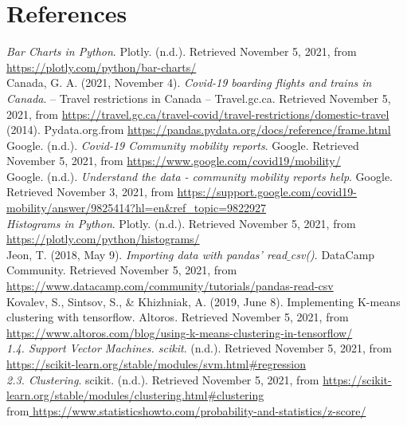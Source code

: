 \documentclass[fontsize=11pt]{article}
\begin{document}
    \newpage
    \section*{References}

    \begin{hangparas}{.25in}{1}

        \emph{Bar Charts in Python}. Plotly. (n.d.). Retrieved November 5, 2021, from \url{https://plotly.com/python/bar-charts/} \\

        Canada, G. A. (2021, November 4). \emph{Covid-19 boarding flights and trains in Canada}. – Travel restrictions in Canada – Travel.gc.ca. Retrieved November
        5, 2021, from \url{https://travel.gc.ca/travel-covid/travel-restrictions/domestic-travel} \\

        (2014). Pydata.org.from \url{https://pandas.pydata.org/docs/reference/frame.html}\\

        Google. (n.d.). \emph{Covid-19 Community mobility reports}. Google. Retrieved November 5, 2021, from \url{https://www.google.com/covid19/mobility/} \\

        Google. (n.d.). \emph{Understand the data - community mobility reports help}. Google. Retrieved November 3, 2021, from \url{https://support.google.com/covid19-mobility/answer/9825414?hl=en\&ref_topic=9822927} \\

        \emph{Histograms in Python}. Plotly. (n.d.). Retrieved November 5, 2021, from \url{https://plotly.com/python/histograms/} \\

        Jeon, T. (2018, May 9). \emph{Importing data with pandas' read$\_$csv()}. DataCamp Community. Retrieved November 5, 2021, from \url{https://www.datacamp.com/community/tutorials/pandas-read-csv} \\

        Kovalev, S., Sintsov, S., \& Khizhniak, A. (2019, June 8). Implementing K-means clustering with tensorflow. Altoros. Retrieved November 5, 2021, from \url{https://www.altoros.com/blog/using-k-means-clustering-in-tensorflow/}\\

        \emph{1.4. Support Vector Machines. scikit}. (n.d.). Retrieved November 5, 2021, from \url{https://scikit-learn.org/stable/modules/svm.html\#regression} \\

        \emph{2.3. Clustering}. scikit. (n.d.). Retrieved November 5, 2021, from \url{https://scikit-learn.org/stable/modules/clustering.html\#clustering} \\

         from\url{ https://www.statisticshowto.com/probability-and-statistics/z-score/}


    \end{hangparas}
\end{document}
